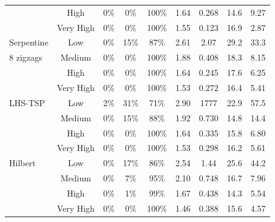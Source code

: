 \documentclass[review]{elsarticle}
\begin{document}
\begin{table}[h!]
\begin{tabular}{|l|c|c|c|c|cc|cc|}
&             High & 0\% &  0\% & 100\% & 1.64 & 0.268 & 14.6 &  9.27 \\
&        Very High & 0\% &  0\% & 100\% & 1.55 & 0.123 & 16.9 &  2.87 \\
\hline
Serpentine &   Low & 0\% & 15\% &  87\% & 2.61 & 2.07  & 29.2 & 33.3  \\
8 zigzags & Medium & 0\% &  0\% & 100\% & 1.88 & 0.408 & 18.3 &  8.15 \\
&             High & 0\% &  0\% & 100\% & 1.64 & 0.245 & 17.6 &  6.25 \\
&        Very High & 0\% &  0\% & 100\% & 1.53 & 0.272 & 16.4 &  5.41 \\
\hline
LHS-TSP & Low & 2\% & 31\% &  71\% & 2.90 & 1777  & 22.9 & 57.5  \\
&      Medium & 0\% & 15\% &  88\% & 1.92 & 0.730 & 14.8 & 14.4  \\
&        High & 0\% &  0\% & 100\% & 1.64 & 0.335 & 15.8 &  6.80 \\
&   Very High & 0\% &  0\% & 100\% & 1.53 & 0.298 & 16.2 &  5.61 \\
\hline
Hilbert & Low & 0\% & 17\% &  86\% & 2.54 & 1.44  & 25.6 & 44.2  \\
&      Medium & 0\% &  7\% &  95\% & 2.10 & 0.748 & 16.7 &  7.96 \\
&        High & 0\% &  1\% &  99\% & 1.67 & 0.438 & 14.3 &  5.54 \\
&   Very High & 0\% &  0\% & 100\% & 1.46 & 0.388 & 15.6 &  4.57 \\
\hline
\end{tabular}
\end{table}

\end{document}
